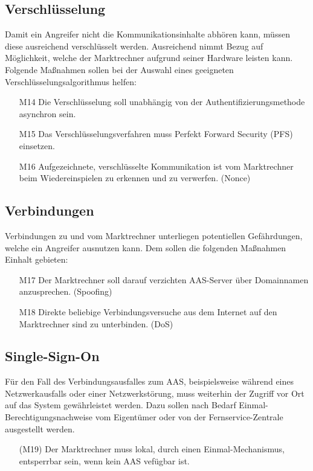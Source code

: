 \documentclass[11pt,a4paper]{report}
\begin{document}
\subsection{Verschlüsselung}
Damit ein Angreifer nicht die Kommunikationsinhalte abhören kann, müssen diese ausreichend verschlüsselt werden. Ausreichend nimmt Bezug auf Möglichkeit, welche der Marktrechner aufgrund seiner Hardware leisten kann. Folgende Maßnahmen sollen bei der Auswahl eines geeigneten Verschlüsselungsalgorithmus helfen:

\begin{enumerate}
\item[M14] Die Verschlüsselung soll unabhängig von der Authentifizierungsmethode asynchron sein.
\item[M15] Das Verschlüsselungsverfahren muss Perfekt Forward Security (PFS) einsetzen.
\item[M16] Aufgezeichnete, verschlüsselte Kommunikation ist vom Marktrechner beim Wiedereinspielen zu erkennen und zu verwerfen. (Nonce)
\end{enumerate}

\subsection{Verbindungen}
Verbindungen zu und vom Marktrechner unterliegen potentiellen Gefährdungen, welche ein Angreifer ausnutzen kann. Dem sollen die folgenden Maßnahmen Einhalt gebieten:

\begin{enumerate}
\item[M17] Der Marktrechner soll darauf verzichten AAS-Server über Domainnamen anzusprechen. (Spoofing)
\item[M18] Direkte beliebige Verbindungsversuche aus dem Internet auf den Marktrechner sind zu unterbinden. (DoS)
\end{enumerate}

\subsection{Single-Sign-On}
Für den Fall des Verbindungsausfalles zum AAS, beispielsweise während eines Netzwerkausfalls oder einer Netzwerkstörung, muss weiterhin der Zugriff vor Ort auf das System gewährleistet werden. Dazu sollen nach Bedarf Einmal-Berechtigungsnachweise vom Eigentümer oder von der Fernservice-Zentrale ausgestellt werden.

\begin{enumerate}
\item[(M19)] Der Marktrechner muss lokal, durch einen Einmal-Mechanismus, entsperrbar sein, wenn kein AAS vefügbar ist.
\end{enumerate}
\end{document}
